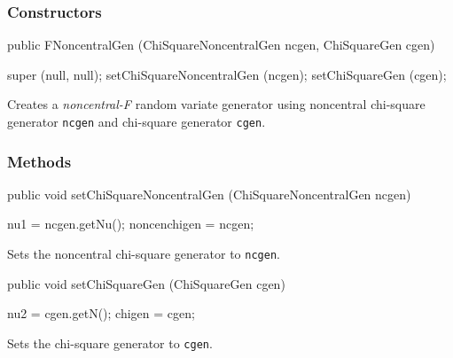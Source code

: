 \subsubsection* {Constructors}
\begin{code}

   public FNoncentralGen (ChiSquareNoncentralGen ncgen, ChiSquareGen cgen) \begin{hide} {
      super (null, null);
      setChiSquareNoncentralGen (ncgen);
      setChiSquareGen (cgen);
   }\end{hide}
\end{code}
\begin{tabb}  Creates a \emph{noncentral-F} random variate generator
 using noncentral chi-square generator \texttt{ncgen} and 
 chi-square generator \texttt{cgen}.
\end{tabb}


\subsubsection* {Methods}
\begin{code}

   public void setChiSquareNoncentralGen (ChiSquareNoncentralGen ncgen)\begin{hide} {
      nu1 = ncgen.getNu();
      noncenchigen = ncgen;
   }\end{hide}
\end{code}
 \begin{tabb} Sets the noncentral chi-square generator to \texttt{ncgen}.
 \end{tabb}
\begin{code}

   public void setChiSquareGen (ChiSquareGen cgen)\begin{hide} {
      nu2 = cgen.getN();
      chigen = cgen;
   }\end{hide}
\end{code}
 \begin{tabb} Sets the chi-square generator to \texttt{cgen}.
 \end{tabb}
\begin{code}
\begin{hide}
}
\end{hide}
\end{code}
